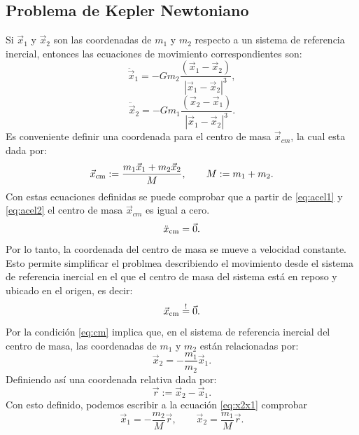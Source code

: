\subsection{Problema de Kepler Newtoniano}
Si $\vec{x}_1$ y $\vec{x}_2$ son las coordenadas de $m_1$ y $m_2$ respecto a un sistema de referencia
inercial, entonces las ecuaciones de movimiento correspondientes son:
\begin{equation}
\ddot{\vec{x}}_1=-Gm_2\frac{(\vec{x}_1-\vec{x}_2)}{|\vec{x}_1-\vec{x}_2|^3} ,\label{eq:acel1}
\end{equation}
\begin{equation}
\ddot{\vec{x}}_2=-Gm_1\frac{(\vec{x}_2-\vec{x}_1)}{|\vec{x}_1-\vec{x}_2|^3} .\label{eq:acel2}
\end{equation}
Es conveniente definir una coordenada para el centro de masa $\vec{x}_{cm}$, la cual esta dada por:
\begin{equation}
\vec{x}_{\rm cm}:=\frac{m_1\vec{x}_1+m_2\vec{x}_2}{M}, \qquad M:=m_1+m_2.
\end{equation}
Con estas ecuaciones definidas se puede comprobar que a partir de \ref{eq:acel1} y \ref{eq:acel2}  el centro de masa $\vec{x}_{cm}$ es igual a cero.
\begin{equation*}
    \ddot{x}_{\rm cm} = \vec{0}.
\end{equation*}
Por lo tanto, la coordenada del centro de masa se mueve a velocidad constante. Esto permite simplificar
el problmea describiendo el movimiento desde el sistema de referencia inercial en el que el centro de masa
del sistema está en reposo y ubicado en el origen, es decir:
\begin{equation}
    \vec{x}_{\rm cm}\stackrel{!}{=}\vec{0}. \label{eq:cm}
\end{equation}
Por la condición \ref{eq:cm} implica que, en el sistema de referencia inercial del centro de masa, las coordenadas
de $m_1$ y $m_2$ están relacionadas por:
\begin{equation}
    \vec{x}_2 = -\frac{m_1}{m_2} \vec{x}_1. \label{eq:x2x1}
\end{equation}
Definiendo así una coordenada relativa dada por:
\begin{equation}
    \vec{r}:= \vec{x}_2 - \vec{x}_1 \label{eq:r}.
\end{equation}
Con esto definido, podemos escribir a la ecuación \ref{eq:x2x1} comprobar
\begin{equation}\label{eq:x12fr}
    \vec{x}_1=-\frac{m_2}{M}\vec{r}, \qquad \vec{x}_2=\frac{m_1}{M}\vec{r}.
\end{equation}
